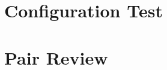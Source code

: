 \section{Configuration Test}
\label{sec:configuration_test}

\section{Pair Review}
\label{sec:pair_review}


